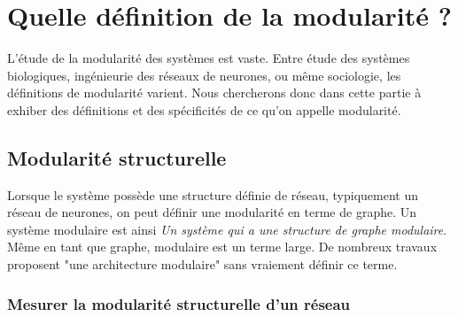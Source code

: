 






\section{Quelle définition de la modularité ?}

L'étude de la modularité des systèmes est vaste. Entre étude des systèmes biologiques, ingénieurie des réseaux de neurones, ou même sociologie, les définitions de modularité varient. Nous chercherons donc dans cette partie à exhiber des définitions et des spécificités de ce qu'on appelle modularité.

\subsection{Modularité structurelle}

Lorsque le système possède une structure définie de réseau, typiquement un réseau de neurones, on peut définir une modularité en terme de graphe. Un système modulaire est ainsi \emph{Un système qui a une structure de graphe modulaire}.
Même en tant que graphe, modulaire est un terme large. De nombreux travaux proposent "une architecture modulaire" sans vraiement définir ce terme. 

\subsubsection{Mesurer la modularité structurelle d'un réseau}

